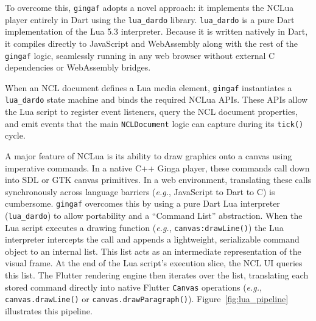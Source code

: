 \documentclass[sigconf,authorversion,review,authordraft]{webmedia}
\newcommand{\projectname}{\texttt{gingaf}}
\begin{document}
To overcome this, \projectname{} adopts a novel approach: it implements the NCLua player entirely in Dart using the \texttt{lua\_dardo} library. \texttt{lua\_dardo} is a pure Dart implementation of the Lua 5.3 interpreter. Because it is written natively in Dart, it compiles directly to JavaScript and WebAssembly along with the rest of the \projectname{} logic, seamlessly running in any web browser without external C dependencies or WebAssembly bridges.

When an NCL document defines a Lua media element, \projectname{} instantiates a \texttt{lua\_dardo} state machine and binds the required NCLua APIs. These APIs allow the Lua script to register event listeners, query the NCL document properties, and emit events that the main \texttt{NCLDocument} logic can capture during its \texttt{tick()} cycle.

A major feature of NCLua is its ability to draw graphics onto a canvas using imperative commands. In a native C++ Ginga player, these commands call down into SDL or GTK canvas primitives. In a web environment, translating these calls synchronously across language barriers (\textit{e.g.}, JavaScript to Dart to C) is cumbersome. \projectname{} overcomes this by using a pure Dart Lua interpreter (\texttt{lua\_dardo}) to allow portability and a ``Command List'' abstraction. When the Lua script executes a drawing function (\textit{e.g.}, \texttt{canvas:drawLine()}) the Lua interpreter intercepts the call and appends a lightweight, serializable command object to an internal list. This list acts as an intermediate representation of the visual frame. At the end of the Lua script's execution slice, the NCL UI queries this list. The Flutter rendering engine then iterates over the list, translating each stored command directly into native Flutter \texttt{Canvas} operations (\textit{e.g.}, \texttt{canvas.drawLine()} or \texttt{canvas.drawParagraph()}). Figure~\ref{fig:lua_pipeline} illustrates this pipeline.
\end{document}
